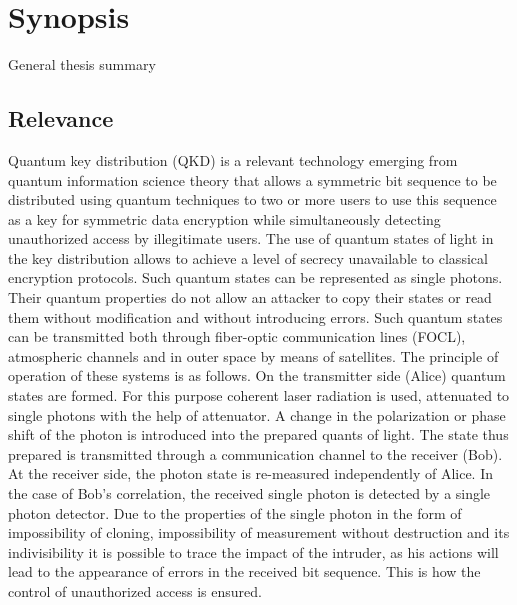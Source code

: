 
\chapter*{Synopsis}
\renewcommand{\figurename}{Figure}
\renewcommand{\thefigure}{\arabic{figure}} %
\setcounter{figure}{0}                     %

\begin{center}
    General thesis summary
\end{center}

\section*{Relevance}
Quantum key distribution (QKD) is a relevant technology emerging from quantum information science theory that allows a symmetric bit sequence to be distributed using quantum techniques to two or more users to use this sequence as a key for symmetric data encryption while simultaneously detecting unauthorized access by illegitimate users. The use of quantum states of light in the key distribution allows to achieve a level of secrecy unavailable to classical encryption protocols. Such quantum states can be represented as single photons. Their quantum properties do not allow an attacker to copy their states or read them without modification and without introducing errors. Such quantum states can be transmitted both through fiber-optic communication lines (FOCL), atmospheric channels and in outer space by means of satellites. The principle of operation of these systems is as follows. On the transmitter side (Alice) quantum states are formed. For this purpose coherent laser radiation is used, attenuated to single photons with the help of attenuator. A change in the polarization or phase shift of the photon is introduced into the prepared quants of light. The state thus prepared is transmitted through a communication channel to the receiver (Bob). At the receiver side, the photon state is re-measured independently of Alice. In the case of Bob's correlation, the received single photon is detected by a single photon detector. Due to the properties of the single photon in the form of impossibility of cloning, impossibility of measurement without destruction and its indivisibility it is possible to trace the impact of the intruder, as his actions will lead to the appearance of errors in the received bit sequence. This is how the control of unauthorized access is ensured. 

